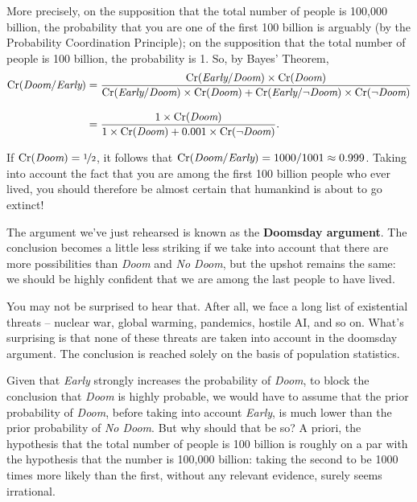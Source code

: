 More precisely, on the supposition that the total number
of people is 100,000 billion, the probability that you are one of the
first 100 billion is arguably  (by the Probability
Coordination Principle); on the supposition that the total number of
people is 100 billion, the probability is 1. So, by Bayes' Theorem,
\begin{align*}
  \text{Cr}(\emph{Doom}/\emph{Early}) &= \frac{\text{Cr}(\emph{Early}/\emph{Doom}) \times \text{Cr}(\emph{Doom})}{\text{Cr}(\emph{Early}/\emph{Doom}) \times \text{Cr}(\emph{Doom}) + \text{Cr}(\emph{Early}/\neg\emph{Doom}) \times \text{Cr}(\neg \emph{Doom})}\\[3mm]
    &= \frac{1 \times \text{Cr}(\emph{Doom})}{1 \times \text{Cr}(\emph{Doom}) + 0.001 \times \text{Cr}(\neg\emph{Doom})}.
\end{align*}

\smallskip 

If $\text{Cr}(\emph{Doom}) = \nicefrac{1}{2}$, it follows that
$\text{Cr}(\emph{Doom}/\emph{Early}) = 1000/1001 \approx 0.999$. Taking into
account the fact that you are among the first 100 billion people who
ever lived, you should therefore be almost certain that humankind is
about to go extinct!

The argument we've just rehearsed is known as the \textbf{Doomsday
  argument}. The conclusion becomes a little less striking if we take
into account that there are more possibilities than \emph{Doom} and
\emph{No Doom}, but the upshot remains the same: we should be highly
confident that we are among the last people to have lived.

You may not be surprised to hear that. After all, we face a long list
of existential threats -- nuclear war, global warming,
pandemics, hostile AI, and so on. What's surprising is that none of
these threats are taken into account in the doomsday argument. The
conclusion is reached solely on the basis of population statistics.

Given that \emph{Early} strongly increases the probability of
\emph{Doom}, to block the conclusion that \emph{Doom} is highly
probable, we would have to assume that the prior probability of
\emph{Doom}, before taking into account \emph{Early}, is much lower
than the prior probability of \emph{No Doom}. But why should that be
so? A priori, the hypothesis that the total number of people is 100
billion is roughly on a par with the hypothesis that the number is
100,000 billion: taking the second to be 1000 times more likely than
the first, without any relevant evidence, surely seems irrational.

